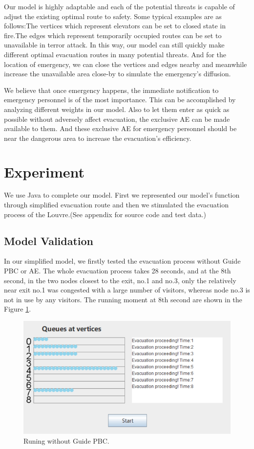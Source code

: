 \documentclass[12pt]{article}
\begin{document}
Our model is highly adaptable and each of the potential threats is capable of adjust the existing optimal route to safety. Some typical examples are as follows:The vertices which represent elevators can be set to closed state in fire.The edges which represent temporarily occupied routes can be set to unavailable in terror attack. 
In this way, our model can still quickly make different optimal evacuation routes in many potential threats. And for the location of emergency, we can close the vertices and edges nearby and meanwhile increase the unavailable area close-by to simulate the emergency's diffusion.

We believe that once emergency happens, the immediate notification to emergency personnel is of the most importance. This can be accomplished by analyzing different weights in our model. Also to let them enter as quick as possible without adversely affect evacuation, the exclusive AE can be made available to them. And these exclusive AE for emergency personnel should be near the dangerous area to increase the evacuation's efficiency. 


\section{Experiment}
We use Java to complete our model. First we represented our model's function through simplified evacuation route and then we stimulated the evacuation process of the Louvre.(See appendix for source code and test data.)
\subsection{Model Validation}
In our simplified model, we firstly tested the evacuation process 
without Guide PBC or AE. The whole evacuation process takes 28 seconds, 
and at the 8th second, in the two nodes closest to the exit, no.1 and no.3, 
only the relatively near exit no.1 was congested with a large number of 
visitors, whereas node no.3 is not in use by any visitors. 
The running moment at 8th second are shown in the Figure \ref{fig:fig8}.
\begin{figure}[ht]
	\centering
	\includegraphics[scale=0.4]{figure9.png}
	\caption{Runing without Guide PBC.}
	\label{fig:fig8}
\end{figure}
\end{document}
